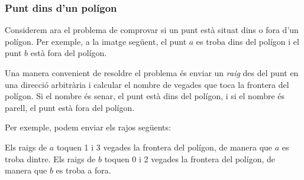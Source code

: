\subsubsection{Punt dins d'un polígon}

Considerem ara el problema de comprovar si un punt està situat dins o fora d'un polígon. Per exemple, a la imatge següent, el punt $a$ es troba dins del polígon i el punt $b$ està fora del polígon.


\begin{center}
\end{center}


Una manera convenient de resoldre el problema és enviar un \emph{raig}
des del punt en una direcció arbitrària i calcular el nombre de
vegades que toca la frontera del polígon. Si el nombre és senar, el
punt està dins del polígon, i si el nombre és parell, el punt està
fora del polígon.

\begin{samepage}
Per exemple, podem enviar els rajos següents:
\begin{center}
\end{center}
\end{samepage}


Els raigs de $a$ toquen 1 i 3 vegades la frontera del polígon, de
manera que $a$ es troba dintre. Els raigs de $b$ toquen 0 i 2 vegades
la frontera del polígon, de manera que $b$ es troba a fora.

